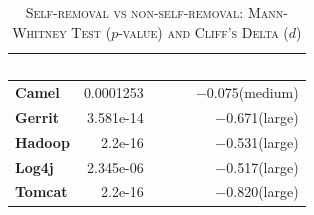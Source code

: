 


\begin{table}[t]
	\begin{center}
		\caption{\textsc{Self-removal vs non-self-removal: Mann-Whitney Test ($p$-value) and Cliff's Delta ($d$)}}
		\label{tbl:statistic}
		\begin{tabular}{l| rrr}
			\toprule
			\textbf{\thead{Project}} & \textbf{\thead{$p$-value}}&~~~ & \textbf{\thead{$d$}}\\ 
			\midrule
			\textbf{Camel }   &  0.0001253& ~~~ &  $-$0.075(medium)  \\  
			\textbf{Gerrit}   &  3.581e-14& ~~~ &  $-$0.671(large)  \\  
			\textbf{Hadoop}   &   2.2e-16& ~~~ &  $-$0.531(large)  \\  
			\textbf{Log4j}   &  2.345e-06 & ~~~ &  $-$0.517(large)  \\  
			\textbf{Tomcat}   &  2.2e-16  & ~~~ &  $-$0.820(large) \\  
			\bottomrule
		\end{tabular}
	\end{center} 
	\vspace{-0.1in}   
\end{table}











